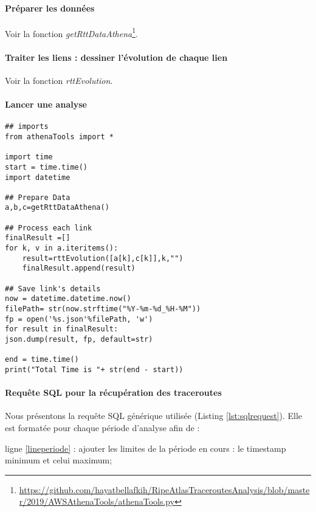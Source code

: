 \documentclass[]{report}
\begin{document}
\paragraph{Préparer les données} Voir la fonction \textit{getRttDataAthena}\footnote{\url{https://github.com/hayatbellafkih/RipeAtlasTraceroutesAnalysis/blob/master/2019/AWSAthenaTools/athenaTools.py}}.

\paragraph{Traiter  les liens : dessiner l'évolution de chaque lien} Voir la fonction \textit{rttEvolution}.

\paragraph{Lancer une analyse } 

\begin{lstlisting}
## imports
from athenaTools import *

import time
start = time.time()
import datetime

## Prepare Data
a,b,c=getRttDataAthena()

## Process each link
finalResult =[]
for k, v in a.iteritems():
	result=rttEvolution([a[k],c[k]],k,"")
	finalResult.append(result)

## Save link's details
now = datetime.datetime.now()
filePath= str(now.strftime("%Y-%m-%d_%H-%M"))
fp = open('%s.json'%filePath, 'w')
for result in finalResult:
json.dump(result, fp, default=str)

end = time.time()
print("Total Time is "+ str(end - start))
\end{lstlisting}

\paragraph{Requête SQL pour la récupération des traceroutes} \label{sqlformat}

Nous présentons la requête SQL générique utilisée (Listing \ref{lst:sqlrequest}). Elle est formatée pour chaque période d'analyse afin de :
 
 ligne \ref{lineperiode} : ajouter les limites de la période en cours : le timestamp minimum et celui maximum;
 
\end{document}
